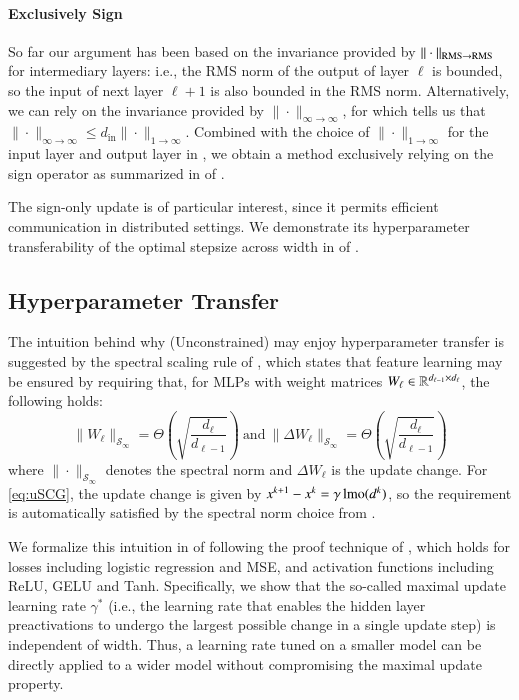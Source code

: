 \paragraph{Exclusively Sign}
So far our argument has been based on the invariance provided by $\|\cdot\|_{\mathrm{RMS} \rightarrow \mathrm{RMS}}$ for intermediary layers: i.e., the RMS norm of the output of layer $\ell$ is bounded, so the input of next layer $\ell+1$ is also bounded in the RMS norm. %
Alternatively, we can rely on the invariance provided by $\|\cdot\|_{\infty \rightarrow \infty}$, for which  tells us that $\|\cdot\|_{\infty \rightarrow \infty} \leq d_\mathrm{in}\|\cdot\|_{1 \rightarrow \infty}$.
Combined with the choice of $\|\cdot\|_{1 \rightarrow \infty}$ for the input layer and output layer in , we obtain a method exclusively relying on the sign operator as summarized in  of .

The sign-only update is of particular interest, since it permits efficient communication in distributed settings.
We demonstrate its hyperparameter transferability of the optimal stepsize across width in  of .



\subsection{Hyperparameter Transfer}\label{sec:transfer}
The intuition behind why ({\sc Unconstrained}) \Scion may enjoy hyperparameter transfer is suggested by the spectral scaling rule of \citet{yang2023spectral}, which states that feature learning may be ensured by requiring that, for MLPs with weight matrices $W_\ell \in \mathbb{R}^{d_{\ell-1} \times d_\ell}$, the following holds:
\begin{equation*}
\textstyle \|W_\ell\|_{\mathcal{S}_\infty} = \Theta\left(\sqrt{\frac{d_\ell}{d_{\ell-1}}}\right)
\ \text{and} \
\|\Delta W_\ell\|_{\mathcal{S}_\infty} = \Theta\left(\sqrt{\frac{d_\ell}{d_{\ell-1}}}\right)
\end{equation*}
where $\|\cdot\|_{\mathcal{S}_\infty}$ denotes the spectral norm and $\Delta W_\ell$ is the update change.
For \ref{eq:uSCG}, the update change is given by $x^{k+1}-x^k=\gamma \operatorname{lmo}(d^k)$, so the requirement is automatically satisfied by the spectral norm choice from .

We formalize this intuition in  of  following the proof technique of \citet{yang2023spectral}, which holds for losses including logistic regression and MSE, and activation functions including ReLU, GELU and Tanh.
Specifically, we show that the so-called maximal update learning rate $\gamma^*$ 
(i.e., the learning rate that enables the hidden layer preactivations to undergo the largest possible change in a single update step) is independent of width.
Thus, a learning rate tuned on a smaller model can be directly applied to a wider model without compromising the maximal update property.


